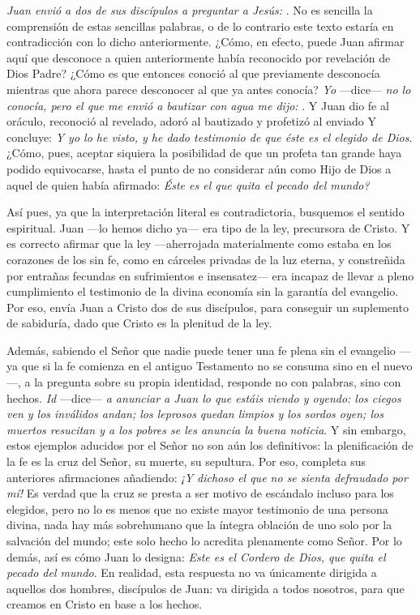 			\begin{body}
				\emph{Juan envió a dos de sus discípulos a preguntar a Jesús: }. No es sencilla la comprensión de estas sencillas palabras, o de lo contrario este texto estaría en contradicción con lo dicho anteriormente. ¿Cómo, en efecto, puede Juan afirmar aquí que desconoce a quien anteriormente había reconocido por revelación de Dios Padre? ¿Cómo es que entonces conoció al que previamente desconocía mientras que ahora parece desconocer al que ya antes conocía? \emph{Yo} ---dice--- \emph{no lo conocía, pero el que me envió a bautizar con agua me dijo: }. Y Juan dio fe al oráculo, reconoció al revelado, adoró al bautizado y profetizó al enviado Y concluye: \emph{Y yo lo he visto, y he dado testimonio de que éste es el elegido de Dios}. ¿Cómo, pues, aceptar siquiera la posibilidad de que un profeta tan grande haya podido equivocarse, hasta el punto de no considerar aún como Hijo de Dios a aquel de quien había afirmado: \emph{Éste es el que quita el pecado del mundo?} 
				
				Así pues, ya que la interpretación literal es contradictoria, busquemos el sentido espiritual. Juan ---lo hemos dicho ya--- era tipo de la ley, precursora de Cristo. Y es correcto afirmar que la ley ---aherrojada materialmente como estaba en los corazones de los sin fe, como en cárceles privadas de la luz eterna, y constreñida por entrañas fecundas en sufrimientos e insensatez--- era incapaz de llevar a pleno cumplimiento el testimonio de la divina economía sin la garantía del evangelio. Por eso, envía Juan a Cristo dos de sus discípulos, para conseguir un suplemento de sabiduría, dado que Cristo es la plenitud de la ley. 
				
				Además, sabiendo el Señor que nadie puede tener una fe plena sin el evangelio ---ya que si la fe comienza en el antiguo Testamento no se consuma sino en el nuevo---, a la pregunta sobre su propia identidad, responde no con palabras, sino con hechos. \emph{Id} ---dice--- \emph{a anunciar a Juan lo que estáis viendo y oyendo: los ciegos ven y los inválidos andan; los leprosos quedan limpios y los sordos oyen; los muertos resucitan y a los pobres se les anuncia la buena noticia}. Y sin embargo, estos ejemplos aducidos por el Señor no son aún los definitivos: la plenificación de la fe es la cruz del Señor, su muerte, su sepultura. Por eso, completa sus anteriores afirmaciones añadiendo: \emph{¡Y dichoso el que no se sienta defraudado por mí!} Es verdad que la cruz se presta a ser motivo de escándalo incluso para los elegidos, pero no lo es menos que no existe mayor testimonio de una persona divina, nada hay más sobrehumano que la íntegra oblación de uno solo por la salvación del mundo; este solo hecho lo acredita plenamente como Señor. Por lo demás, así es cómo Juan lo designa: \emph{Este es el Cordero de Dios, que quita el pecado del mundo}. En realidad, esta respuesta no va únicamente dirigida a aquellos dos hombres, discípulos de Juan: va dirigida a todos nosotros, para que creamos en Cristo en base a los hechos. 
				

\end{body}
